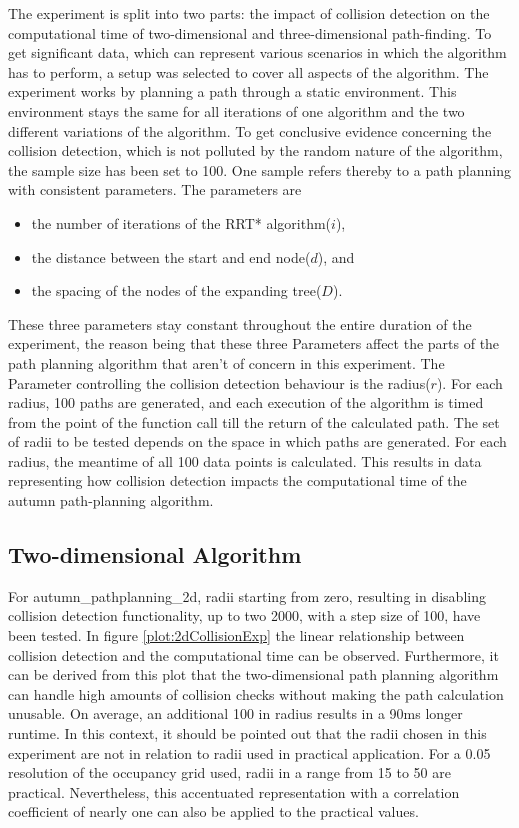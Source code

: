 The experiment is split into two parts: the impact of collision detection on the computational time of two-dimensional and three-dimensional path-finding.
To get significant data, which can represent various scenarios in which the algorithm has to perform, a setup was selected to cover all aspects of the algorithm. The experiment works by planning a path through a static environment. This environment stays the same for all iterations of one algorithm and the two different variations of the algorithm. To get conclusive evidence concerning the collision detection, which is not polluted by the random nature of the algorithm, the sample size has been set to 100. \newline One sample refers thereby to a path planning with consistent parameters. The parameters are
\begin{itemize}
	\item the number of iterations of the RRT* algorithm($i$),
	\item the distance between the start and end node($d$), and
	\item the spacing of the nodes of the expanding tree($D$).
\end{itemize}
These three parameters stay constant throughout the entire duration of the experiment, the reason being that these three Parameters affect the parts of the path planning algorithm that aren't of concern in this experiment. The Parameter controlling the collision detection behaviour is the radius($r$).
For each radius, 100 paths are generated, and each execution of the algorithm is timed from the point of the function call till the return of the calculated path. 
The set of radii to be tested depends on the space in which paths are generated.
For each radius, the meantime of all 100 data points is calculated. This results in data representing how collision detection impacts the computational time of the autumn path-planning algorithm.

\subsection{Two-dimensional Algorithm}

For autumn\_pathplanning\_2d, radii starting from zero, resulting in disabling collision detection functionality, up to two 2000, with a step size of 100, have been tested. In figure \ref{plot:2dCollisionExp} the linear relationship between collision detection and the computational time can be observed. Furthermore, it can be derived from this plot that the two-dimensional path planning algorithm can handle high amounts of collision checks without making the path calculation unusable. On average, an additional 100 in radius results in a 90ms longer runtime. In this context, it should be pointed out that the radii chosen in this experiment are not in relation to radii used in practical application. For a 0.05 resolution of the occupancy grid used, radii in a range from 15 to 50 are practical. Nevertheless, this accentuated representation with a correlation coefficient of nearly one can also be applied to the practical values.   

